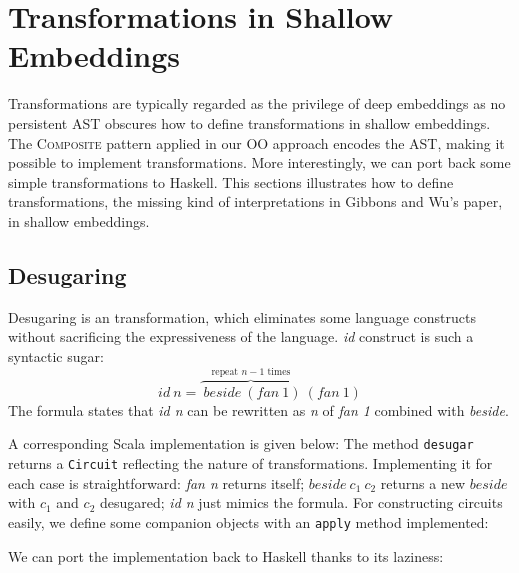 \section{Transformations in Shallow Embeddings}
Transformations are typically regarded as the privilege of deep embeddings as no
persistent AST obscures how to define transformations in shallow embeddings.
The \textsc{Composite} pattern applied in our OO approach encodes the AST, making
it possible to implement transformations. More interestingly, we can port back
some simple transformations to Haskell.
This sections illustrates how to define transformations, the missing kind of interpretations in Gibbons and Wu's paper, in shallow embeddings.

\subsection{Desugaring}
Desugaring is an transformation, which eliminates some
language constructs without sacrificing the expressiveness of the language.
\emph{id} construct is such a syntactic sugar:
$$id\ n = \overbrace{\ beside\ (fan\ 1)}^{\text{repeat }n-1\text{ times}}\ (fan\ 1)$$
The formula states that \emph{id n} can be rewritten as \emph{n} of \emph{fan 1}
combined with \emph{beside}.

A corresponding Scala implementation is given below:
The method \lstinline{desugar} returns a
\lstinline{Circuit} reflecting the nature of transformations.
Implementing it for each case is
straightforward: \emph{fan n} returns itself; $beside\ c_1\ c_2$ returns a new
$beside$ with $c_1$ and $c_2$ desugared; \emph{id n} just mimics the formula.
For constructing circuits easily, we define some companion objects with an \lstinline{apply} method implemented:

We can port the implementation back to Haskell thanks to its laziness:

